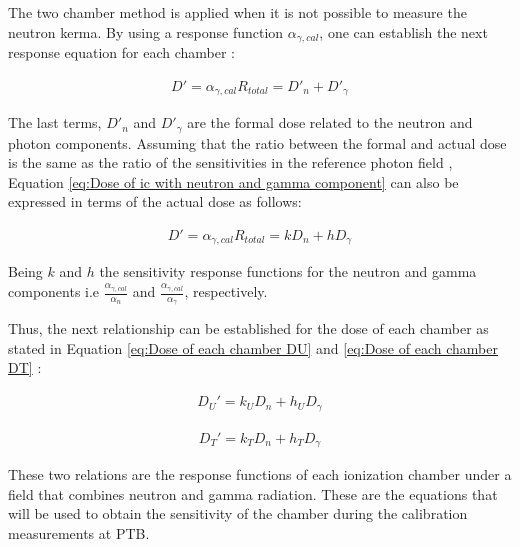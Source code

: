 The two chamber method is applied when it is not possible to measure the neutron kerma. By using a response function $\alpha_{\gamma,cal}$, one can establish the next response equation for each chamber \cite{RadiationOncologyInPhysicsHandbook}: 

\begin{align}
\label{eq:Dose of ic with neutron and gamma component}
    {D' = \alpha_{\gamma,cal} R_{total} = D'_{n} + D'_{\gamma}} 
\end{align}

The last terms, $D'_{n}$ and $ D'_{\gamma}$ are the formal dose related to the neutron and photon components. Assuming that the ratio between the formal and actual dose is the same as the ratio of the sensitivities in the reference photon field \cite{PhDThesisofLucasSommer}, Equation \ref{eq:Dose of ic with neutron and gamma component} can also be expressed in terms of the actual dose as follows:

\begin{align}
\label{eq:Dose of ic with neutron and gamma component in terms of actual dose}
    {D' = \alpha_{\gamma,cal} R_{total} = kD_{n} + hD_{\gamma}} 
\end{align}

Being $k$ and $h$ the sensitivity response functions for the neutron and gamma components i.e  $\frac{\alpha_{\gamma,cal}}{\alpha_n}$ and $\frac{\alpha_{\gamma,cal}}{\alpha_\gamma}$, respectively. 

Thus, the next relationship can be established for the dose of each chamber as stated in Equation \ref{eq:Dose of each chamber DU} and \ref{eq:Dose of each chamber DT} \cite{PhDThesisofLucasSommer}:

\begin{align}
\label{eq:Dose of each chamber DU}
    {D_U' = k_U D_n + h_U D_\gamma}
\end{align}

\begin{align}
\label{eq:Dose of each chamber DT}
    {D_T' = k_T D_n + h_T D_\gamma}
\end{align}

These two relations are the response functions  of each ionization chamber under a field that combines neutron and gamma radiation. These are the equations that will be used to obtain the sensitivity of the chamber during the calibration measurements at PTB.



